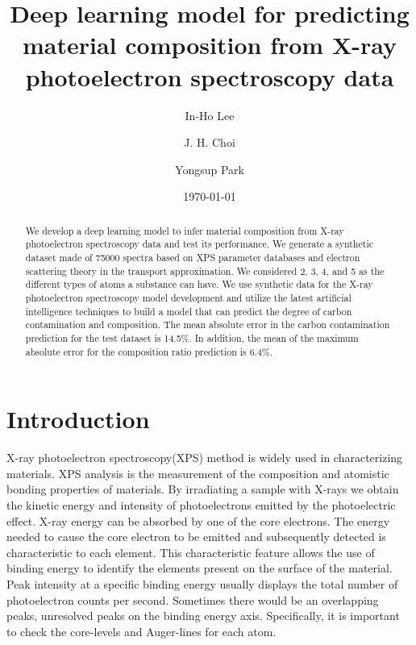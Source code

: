 \documentclass[preprint,aps,floatfix,showpacs]{revtex4-2}
\begin{document}
\title{Deep learning model for predicting material composition from X-ray photoelectron spectroscopy data }
\author{In-Ho Lee} %
\author{J. H. Choi} 
\author{Yongsup Park} 
\date{\today }
	

\begin{abstract}
We develop a deep learning model to infer material composition from X-ray photoelectron spectroscopy data and test its performance.
We generate a synthetic dataset made of 75000 spectra based on XPS parameter databases and electron scattering theory in the transport approximation. We considered 2, 3, 4, and 5 as the different types of atoms a substance can have.
We use synthetic data for the X-ray photoelectron spectroscopy model development and utilize the latest artificial intelligence techniques to build a model that can predict the degree of carbon contamination and composition. 
The mean absolute error in the carbon contamination prediction for the test dataset is 14.5\%. 
In addition, the mean of the maximum absolute error for the composition ratio prediction is 6.4\%.

\end{abstract}
\maketitle
\newpage

\section{Introduction} \label{introduction}
X-ray photoelectron spectroscopy(XPS) method is widely used in characterizing materials.
XPS analysis is the measurement of the composition and atomistic bonding properties of materials.
By irradiating a sample with X-rays we obtain the kinetic energy and intensity of photoelectrons emitted 
by the photoelectric effect\cite{fadley2010x}.
X-ray energy can be absorbed by one of the core electrons. 
The energy needed to cause the core electron to be emitted 
and subsequently detected is characteristic to each element. 
This characteristic feature allows the use of binding energy to identify the elements present on the surface of the material.
Peak intensity at a specific binding energy 
usually displays the total number of photoelectron counts per second. 
Sometimes there would be an overlapping peaks, unresolved peaks on the binding energy axis.
Specifically, it is important to check the core-levels and Auger-lines for each atom. 
\end{document}
